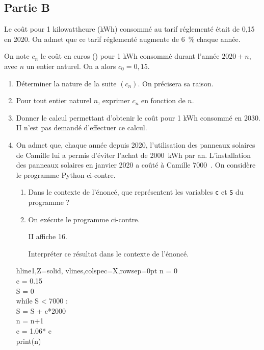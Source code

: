 \documentclass[10pt]{article}
\providecommand{\euro}{\texteuro}
\providecommand{\np}[2][]{{#2~#1}}
\providecommand{\euro}{{\text{€}}}
\renewcommand{\euro}{\ifmmode\text{\texteuro}\else\texteuro\fi}
\begin{document}
\subsection*{Partie B}
Le coût pour 1 kilowattheure (kWh) consommé au tarif réglementé était de 0,15~\euro{} en 2020. On admet que ce tarif réglementé augmente de 6~\% chaque année.

On note $c_{n}$ le coût en euros (\euro{}) pour 1 kWh consommé durant l'année $2020+n$, avec $n$ un entier naturel. On a alors $c_{0}=0,15$.

\begin{enumerate}
	\item Déterminer la nature de la suite $\left(c_{n}\right)$. On précisera sa raison.

	\item Pour tout entier naturel $n$, exprimer $c_{n}$ en fonction de $n$.

	\item Donner le calcul permettant d'obtenir le coût pour 1 kWh consommé en 2030. II n'est pas demandé d'effectuer ce calcul.

	\item On admet que, chaque année depuis 2020, l'utilisation des panneaux solaires de Camille lui a permis d'éviter l'achat de \np[kWh]{2000} par an.
	L'installation des panneaux solaires en janvier 2020 a coûté à Camille 7000~\euro{}.
	On considère le programme Python ci-contre.

	\begin{minipage}{0.5\linewidth}
		\begin{enumerate}
			\item Dans le contexte de l'énoncé, que représentent les variables \texttt{c} et \texttt{S} du programme ?

			\item On exécute le programme ci-contre.

			II affiche 16.

			Interpréter ce résultat dans le contexte de l'énoncé.
		\end{enumerate}
	\end{minipage}
\hfill
\begin{minipage}{0.37\linewidth}
\hfill
\begin{ttfamily}
\begin{tblr}{hline{1,Z}={solid}, vlines,colspec={X},rowsep=0pt}
	n = 0\\
	c = 0.15\\
	S = 0\\
	while S < 7000 :\\
	\qquad S = S + c*2000\\
	\qquad n = n+1\\
	\qquad c = 1.06* c\\
	print(n)\\
\end{tblr}
\end{ttfamily}
\end{minipage}
\hfill~
\end{enumerate}
\end{document}
